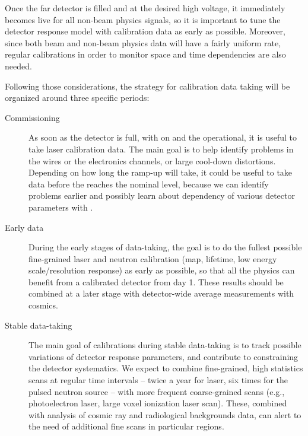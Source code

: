 
Once the far detector is filled and at the desired high voltage, it immediately becomes live for all non-beam physics signals, so it is important to tune the detector response model with calibration data as early as possible. Moreover, since both beam and non-beam physics data will have a fairly uniform rate, regular calibrations in order to monitor space and time dependencies are also needed.

Following those considerations, the strategy for calibration data taking will be organized around three specific periods:
\begin{description}
\item[Commissioning] As soon as the detector is full, with  on and the  operational, it is useful to take laser calibration data. The main goal is to help identify problems in the  wires or the electronics channels, or large cool-down distortions. Depending on how long the ramp-up will take, it could be useful to take data before the  reaches the nominal level, because we can identify problems earlier and possibly learn about dependency of various detector parameters with \efield.
\item[Early data] During the early stages of data-taking, the goal is to do the fullest possible fine-grained laser and neutron calibration (\efield map, lifetime, low energy scale/resolution response) as early as possible, so that all the physics can benefit from a calibrated detector from day 1. 
These results should be combined at a later stage with detector-wide average measurements with cosmics. 
\item[Stable data-taking] The main goal of %
calibrations during stable data-taking is to track possible variations of detector response parameters, and contribute to constraining the %
detector systematics. We expect to combine fine-grained, high statistics scans at regular time intervals -- twice a year for laser, six times for the pulsed neutron source -- with more frequent coarse-grained scans (e.g., photoelectron laser, large voxel ionization laser scan). These, combined with analysis of cosmic ray and radiological backgrounds data, can alert to the need of additional fine scans in particular regions.
\end{description}